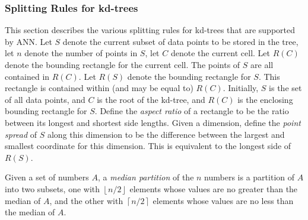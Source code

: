 \documentclass[11pt]{article}		%
\newcommand\floor[1]{\left\lfloor #1\right\rfloor}
\newcommand\ceil[1]{\left\lceil #1\right\rceil}
\newcommand{\ANN}[0]{\textsf{ANN}}
\begin{document}
\subsubsection{Splitting Rules for kd-trees}\label{splitrule.sec}

This section describes the various splitting rules for kd-trees that are
supported by {\ANN}.  Let $S$ denote the current subset of data points to
be stored in the tree, let $n$ denote the number of points in $S$, let
$C$ denote the current cell.  Let $R(C)$ denote the bounding rectangle
for the current cell.  The points of $S$ are all contained in $R(C)$.
Let $R(S)$ denote the bounding rectangle for $S$.   This rectangle is
contained within (and may be equal to) $R(C)$.  Initially, $S$ is the set of
all data points, and $C$ is the root of the kd-tree, and $R(C)$ is the
enclosing bounding rectangle for $S$.  Define the \emph{aspect ratio} of
a rectangle to be the ratio between its longest and shortest side lengths.
Given a dimension, define the \emph{point spread} of $S$ along this
dimension to be the difference between the largest and smallest coordinate
for this dimension.  This is equivalent to the longest side of $R(S)$.

Given a set of numbers $A$, a \emph{median partition} of the $n$ numbers
is a partition of $A$ into two subsets, one with $\floor{n/2}$ elements
whose values are no greater than the median of $A$, and the other with
$\ceil{n/2}$ elements whose values are no less than the median of $A$.
\end{document}
